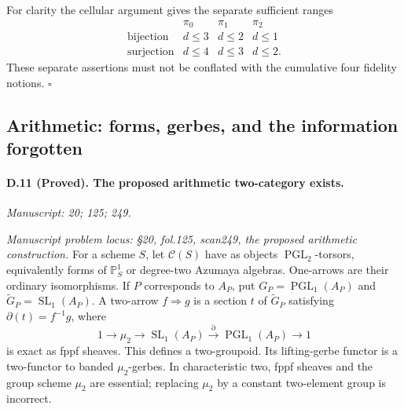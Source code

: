 For clarity the cellular argument gives the separate sufficient ranges
\[
\begin{array}{c|ccc}
 &\pi_0&\pi_1&\pi_2\\\hline
\text{bijection}&d\leq3&d\leq2&d\leq1\\
\text{surjection}&d\leq4&d\leq3&d\leq2.
\end{array}
\]
These separate assertions must not be conflated with the cumulative four fidelity notions. \hfill$\square$

\subsection{Arithmetic: forms, gerbes, and the information forgotten}

\paragraph{D.11 (Proved). The proposed arithmetic two-category exists.}
\textit{Manuscript: 20; 125; 249.}

\emph{Manuscript problem locus: \S20, fol.125, scan249, the proposed arithmetic construction.}
For a scheme $S$, let $\mathcal C(S)$ have as objects $\operatorname{PGL}_2$-torsors, equivalently forms of $\mathbb P^1_S$ or degree-two Azumaya algebras. One-arrows are their ordinary isomorphisms. If $P$ corresponds to $A_P$, put $G_P=\operatorname{PGL}_1(A_P)$ and $\widetilde G_P=\operatorname{SL}_1(A_P)$. A two-arrow $f\Rightarrow g$ is a section $t$ of $\widetilde G_P$ satisfying $\partial(t)=f^{-1}g$, where
\[
1\longrightarrow\mu_2\longrightarrow\operatorname{SL}_1(A_P)
\xrightarrow{\partial}\operatorname{PGL}_1(A_P)\longrightarrow1
\]
is exact as fppf sheaves. This defines a two-groupoid. Its lifting-gerbe functor is a two-functor to banded $\mu_2$-gerbes. In characteristic two, fppf sheaves and the group scheme $\mu_2$ are essential; replacing $\mu_2$ by a constant two-element group is incorrect.

